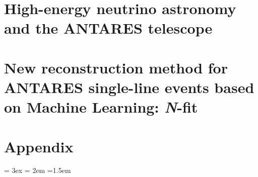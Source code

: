 \documentclass[nocrop, rm, english]{tesisUPV}
\begin{document}

    


\mainmatter




\part{High-energy neutrino astronomy and the ANTARES telescope}
\label{part:1}



\part{New reconstruction method for ANTARES single-line events based on Machine Learning: \emph{N}-fit}
\label{part:2}






\part*{Appendix}
\appendix




\bibitemsep = 3ex
\bibhang = 2em
\emergencystretch=1.5em
\printbibliography[heading=bibintoc,title=\bibname]



\end{document}
